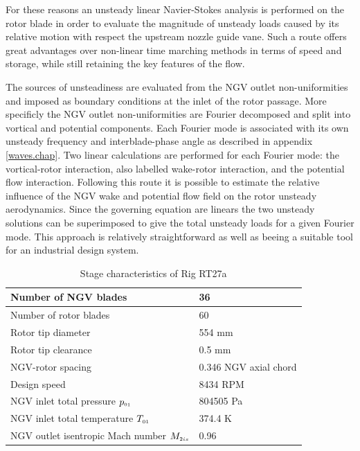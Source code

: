  For these reasons an unsteady linear Navier-Stokes analysis is performed
 on the rotor blade in order to evaluate the magnitude of unsteady loads
 caused by its relative motion with respect the upstream nozzle guide vane.
 Such a route offers great advantages over non-linear time marching methods
 in terms of speed and storage, while still retaining the key features of
 the flow.

 The sources of unsteadiness are evaluated from the NGV outlet non-uniformities
 and imposed as boundary conditions at the inlet of the rotor passage.
 More specificly the NGV outlet non-uniformities are Fourier decomposed and
 split into vortical and potential components. Each Fourier mode
 is associated with its own unsteady frequency and interblade-phase angle as described
 in appendix \ref{waves.chap}.
 Two linear calculations are performed for each Fourier mode: the vortical-rotor
 interaction, also labelled wake-rotor interaction, and the potential flow interaction.
 Following this route it is possible to estimate the relative influence of
 the NGV wake and potential flow field on the rotor unsteady aerodynamics.
 Since the governing equation are linears the two unsteady solutions can be superimposed
 to give the total unsteady loads for a given Fourier mode.
 This approach is relatively straightforward as well as beeing a suitable tool for
 an industrial design system.
%
\begin{table}[h]
\vspace{5mm}
\begin{center}
\begin{tabular}{|l|l|}\hline\hline
 Number of NGV blades & 36\\ \hline
 Number of rotor blades & 60\\ \hline
 Rotor tip diameter & 554 mm \\ \hline
 Rotor tip clearance & 0.5 mm \\ \hline
 NGV-rotor spacing & 0.346 NGV axial chord \\ \hline
 Design speed & 8434 RPM \\ \hline
 NGV inlet total pressure $p_{\mbox{\tiny $01$}}$ & 804505 Pa \\ \hline
 NGV inlet total temperature $T_{\mbox{\tiny $01$}}$ & 374.4 K \\ \hline
 NGV outlet isentropic Mach number $M_{\mbox{\tiny $2is$}}$ & 0.96 \\ \hline
\hline
\end{tabular}
\end{center}
\caption{Stage characteristics of Rig RT27a}
\label{rt27.tab}
\end{table}
%

